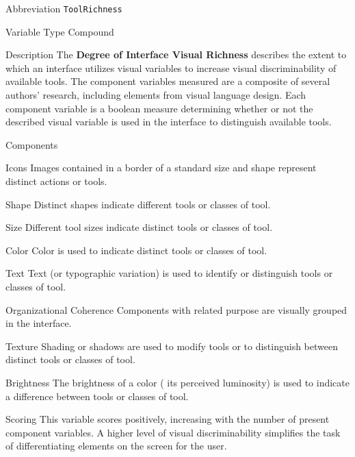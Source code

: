\begin{AlignedDesc}
  \item[Abbreviation] \texttt{ToolRichness}

  \item[Variable Type] Compound

  \item[Description] The \textbf{Degree of Interface Visual Richness}
  describes the extent to which an interface utilizes visual variables to
  increase visual discriminability of available tools. The component
  variables measured are a composite of several authors' research,
  including elements from visual language design. Each component variable
  is a boolean measure determining whether or not the described visual
  variable is used in the interface to distinguish available tools.

  \item[Components]

  \begin{AlignedDesc}
    \item[Icons] Images contained in a border of a standard size and shape
    represent distinct actions or tools.~\cite{costagliola2002,moody2009}
    \item[Shape] Distinct shapes indicate different tools or classes of
    tool.~\cite{moody2009}
    \item[Size] Different tool sizes indicate distinct tools or classes
    of tool.~\cite{moody2009}
    \item[Color] Color is used to indicate distinct tools or classes of
    tool.~\cite{moody2009}
    \item[Text] Text (or typographic variation) is used to identify or
    distinguish tools or classes of tool.~\cite{moody2009}
    \item[Organizational Coherence] Components with related purpose are
    visually grouped in the interface.~\cite{constantine1996}
    \item[Texture] Shading or shadows are used to modify tools or to
    distinguish between distinct tools or classes of tool.~\cite{moody2009}
    \item[Brightness] The brightness of a color (\ie{} its perceived
    luminosity) is used to indicate a difference between tools or classes
    of tool.~\cite{moody2009}
  \end{AlignedDesc}

  \item[Scoring] This variable scores positively, increasing with the
  number of present component variables. A higher level of visual
  discriminability simplifies the task of differentiating elements on the
  screen for the user.

\end{AlignedDesc}

